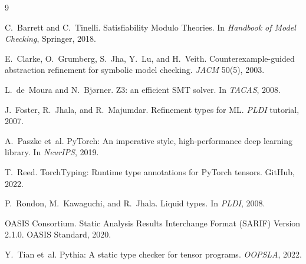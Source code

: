 \documentclass{article}
\theoremstyle{definition}
\begin{document}

\begin{thebibliography}{9}

C.~Barrett and C.~Tinelli.
\newblock Satisfiability Modulo Theories.
\newblock In \emph{Handbook of Model Checking}, Springer, 2018.

E.~Clarke, O.~Grumberg, S.~Jha, Y.~Lu, and H.~Veith.
\newblock Counterexample-guided abstraction refinement for symbolic
  model checking.
\newblock \emph{JACM} 50(5), 2003.

L.~de~Moura and N.~Bj{\o}rner.
\newblock Z3: an efficient SMT solver.
\newblock In \emph{TACAS}, 2008.

J.~Foster, R.~Jhala, and R.~Majumdar.
\newblock Refinement types for ML.
\newblock \emph{PLDI} tutorial, 2007.

A.~Paszke et~al.
\newblock PyTorch: An imperative style, high-performance deep learning
  library.
\newblock In \emph{NeurIPS}, 2019.

T.~Reed.
\newblock TorchTyping: Runtime type annotations for PyTorch tensors.
\newblock GitHub, 2022.

P.~Rondon, M.~Kawaguchi, and R.~Jhala.
\newblock Liquid types.
\newblock In \emph{PLDI}, 2008.

OASIS Consortium.
\newblock Static Analysis Results Interchange Format (SARIF) Version 2.1.0.
\newblock OASIS Standard, 2020.

Y.~Tian et~al.
\newblock Pythia: A static type checker for tensor programs.
\newblock \emph{OOPSLA}, 2022.

\end{thebibliography}
\end{document}

